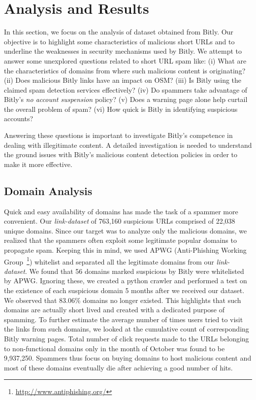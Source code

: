 \documentclass[conference]{IEEEtran}
\begin{document}
\section{Analysis and Results}
\vspace{4pt}
In this section, we focus on the analysis of dataset obtained from Bitly. Our objective is to highlight some characteristics of malicious short URLs and to underline the weaknesses in security mechanisms used by Bitly. We attempt to answer some unexplored questions related to short URL spam like: (i) What are the characteristics of domains from where such malicious content is originating? (ii) Does malicious Bitly links have an impact on OSM? (iii) Is Bitly using the claimed spam detection services effectively? (iv) Do spammers take advantage of Bitly's \textit{no account suspension} policy? (v) Does a warning page alone help curtail the overall problem of spam? (vi) How quick is Bitly in identifying suspicious accounts?

Answering these questions is important to investigate Bitly's competence in dealing with illegitimate content. A detailed investigation is needed to understand the ground issues with Bitly's malicious content detection policies in order to make it more effective. 
\subsection{Domain Analysis}\label{Domain Analysis}
\vspace{4pt}
Quick and easy availability of domains has made the task of a spammer more convenient. Our \textit{link-dataset} of 763,160 suspicious URLs comprised of 22,038 unique domains. Since our target was to analyze only the malicious domains, we realized that the spammers often exploit some legitimate popular domains to propagate spam. Keeping this in mind, we used APWG (Anti-Phishing Working Group~\footnote{\url{http://www.antiphishing.org/}}) whitelist and separated all the legitimate domains from our \textit{link-dataset}. We found that 56 domains marked suspicious by Bitly were whitelisted by APWG.
Ignoring these, we created a python crawler and performed a test on the existence of each suspicious domain 5 months after we received our dataset. We observed that 83.06\% domains no longer existed. This highlights that such domains are actually short lived and created with a dedicated purpose of spamming. To further estimate the average number of times users tried to visit the links from such domains, we looked at the cumulative count of corresponding Bitly warning pages. Total number of click requests made to the URLs belonging to non-functional domains only in the month of October was found to be 9,937,250. Spammers thus focus on buying domains to host malicious content and most of these domains eventually die after achieving a good number of hits.
\end{document}
